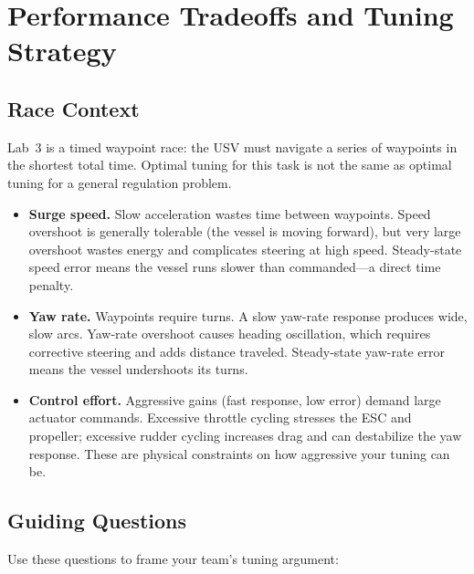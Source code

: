 \documentclass[../../book.tex]{subfiles}
\begin{document}
\section{Performance Tradeoffs and Tuning Strategy}
\label{sec:tradeoffs}

\subsection{Race Context}

Lab~3 is a timed waypoint race: the USV must navigate a series of waypoints in the shortest total time.  Optimal tuning for this task is not the same as optimal tuning for a general regulation problem.

\begin{itemize}
  \item \textbf{Surge speed.}  Slow acceleration wastes time between waypoints.  Speed overshoot is generally tolerable (the vessel is moving forward), but very large overshoot wastes energy and complicates steering at high speed.  Steady-state speed error means the vessel runs slower than commanded---a direct time penalty.

  \item \textbf{Yaw rate.}  Waypoints require turns.  A slow yaw-rate response produces wide, slow arcs.  Yaw-rate overshoot causes heading oscillation, which requires corrective steering and adds distance traveled.  Steady-state yaw-rate error means the vessel undershoots its turns.

  \item \textbf{Control effort.}  Aggressive gains (fast response, low error) demand large actuator commands.  Excessive throttle cycling stresses the ESC and propeller; excessive rudder cycling increases drag and can destabilize the yaw response.  These are physical constraints on how aggressive your tuning can be.
\end{itemize}

\subsection{Guiding Questions}

Use these questions to frame your team's tuning argument:
\end{document}
